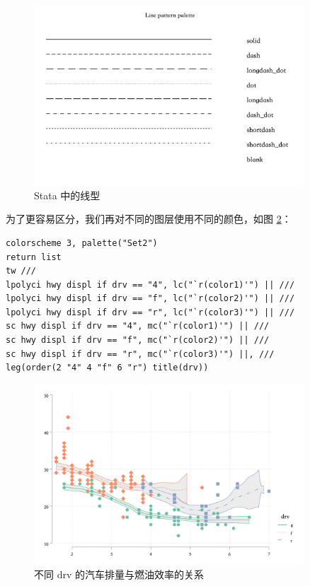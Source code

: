 \documentclass[]{ctexbook}
\begin{document}
\begin{figure}

{\centering \includegraphics[width=0.9\textwidth]{assets/linepalette} 

}

\caption{Stata 中的线型}\label{fig:linepalette}
\end{figure}

为了更容易区分，我们再对不同的图层使用不同的颜色，如图 \ref{fig:lpolycibydrv2}：

\begin{lstlisting}
colorscheme 3, palette("Set2")
return list
tw ///
lpolyci hwy displ if drv == "4", lc("`r(color1)'") || ///
lpolyci hwy displ if drv == "f", lc("`r(color2)'") || ///
lpolyci hwy displ if drv == "r", lc("`r(color3)'") || ///
sc hwy displ if drv == "4", mc("`r(color1)'") || ///
sc hwy displ if drv == "f", mc("`r(color2)'") || ///
sc hwy displ if drv == "r", mc("`r(color3)'") ||, ///
leg(order(2 "4" 4 "f" 6 "r") title(drv))
\end{lstlisting}

\begin{figure}

{\centering \includegraphics[width=0.9\textwidth]{assets/lpolycibydrv2} 

}

\caption{不同 drv 的汽车排量与燃油效率的关系}\label{fig:lpolycibydrv2}
\end{figure}
\end{document}

